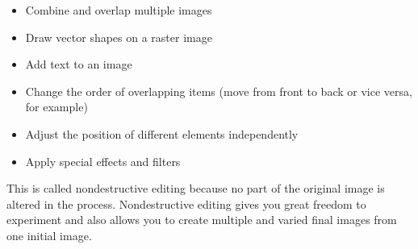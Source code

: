\documentclass{report}
\begin{document}
    \bigbreak \noindent 
    \begin{itemize}
      \item Combine and overlap multiple images
      \item Draw vector shapes on a raster image
      \item Add text to an image
      \item Change the order of overlapping items (move from front to back or vice versa, for example)
      \item Adjust the position of different elements independently
      \item Apply special effects and filters
    \end{itemize}
    \bigbreak \noindent 
    This is called nondestructive editing because no part of the original image is altered in the process. Nondestructive editing gives you great freedom to experiment and also allows you to create multiple and varied final images from one initial image.
\end{document}
